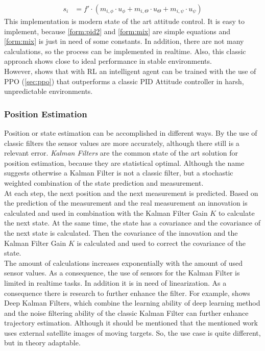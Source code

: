 \begin{align}
	s_i &= f' \cdot (m_{i,\phi} \cdot u_{\phi} + m_{i, \Theta} \cdot u_{\Theta} + m_{i,\psi} \cdot u_{\psi}) \label{form:mix}
\end{align}
\newline
This implementation is modern state of the art attitude control. It is easy to implement, because \cref{form:pid2} and \cref{form:mix} are simple equations and \cref{form:mix} is just in need of some constants. In addition, there are not many calculations, so the process can be implemented in realtime. Also, this classic approach shows close to ideal performance in stable environments.\\
However, \cite{koch2019reinforcement} shows that with RL an intelligent agent can be trained with the use of PPO (\cref{sec:ppo}) that outperforms a classic PID Attitude controller in harsh, unpredictable environments. 

\newpage

\subsubsection{Position Estimation}
Position or state estimation can be accomplished in different ways. By the use of classic filters the sensor values are more accurately, although there still is a relevant error. \emph{Kalman Filters} are the common state of the art solution for position estimation, because they are statistical optimal. Although the name suggests otherwise a Kalman Filter is not a classic filter, but a stochastic weighted combination of the state prediction and measurement. \\
At each step, the next position and the next measurement is predicted. Based on the prediction of the measurement and the real measurement an innovation is calculated and used in combination with the Kalman Filter Gain $K$ to calculate the next state. At the same time, the state has a covariance and the covariance of the next state is calculated. Then the covariance of the innovation and the Kalman Filter Gain $K$ is calculated and used to correct the covariance of the state.\\
The amount of calculations increases exponentially with the amount of used sensor values. As a consequence,
the use of sensors for the Kalman Filter is limited in realtime tasks. In addition it is in need of linearization. As a consequence there is research to further enhance the filter.
For example, \cite{shi2022deep} shows Deep Kalman Filters, which combine the learning ability of deep learning method and the noise filtering ability of the classic Kalman Filter can further enhance trajectory estimation. Although it should be mentioned that the mentioned work uses external satellite images of moving targets. So, the use case is quite different, but in theory adaptable. 

